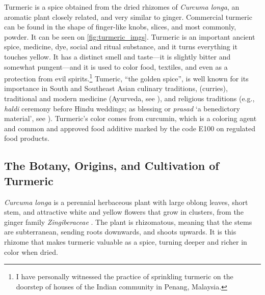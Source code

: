 Turmeric is a spice obtained from the dried rhizomes of \textit{Curcuma longa}, an aromatic plant closely related, and very similar to ginger. Commercial turmeric can be found in the shape of finger-like knobs, slices, and most commonly, powder. It can be seen on \cref{fig:turmeric_imgs}. Turmeric is an important ancient spice, medicine, dye, social and ritual substance, and it turns everything it touches yellow. It has a distinct smell and taste---it is slightly bitter and somewhat pungent---and it is used to color food, textiles, and even as a protection from evil spirits.\footnote{I have personally witnessed the practice of sprinkling turmeric on the doorstep of houses of the Indian community in Penang, Malaysia.} Tumeric, ``the golden spice'', is well known for its importance in South and Southeast Asian culinary traditions, (curries), traditional and modern medicine (Ayurveda, see \textcite{prasad_turmeric_2011}), and religious traditions (e.g., \textit{haldi} ceremony before Hindu weddings; as blessing or \textit{prasad} `a benedictory material', see \textcite{nair_turmeric_2019}). Turmeric's color comes from curcumin, which is a coloring agent and common and approved food additive marked by the code E100 on regulated food products.

\subsection{The Botany, Origins, and Cultivation of Turmeric}



\textit{Curcuma longa} is a perennial herbaceous plant with large oblong leaves, short stem, and attractive white and yellow flowers that grow in clusters, from the ginger family \textit{Zingiberaceae} \autocite[128]{van_wyk_culinary_2014}. The plant is rhizomatous, meaning that the stems are subterranean, sending roots downwards, and shoots upwards. It is this rhizome that makes turmeric valuable as a spice, turning deeper and richer in color when dried.

